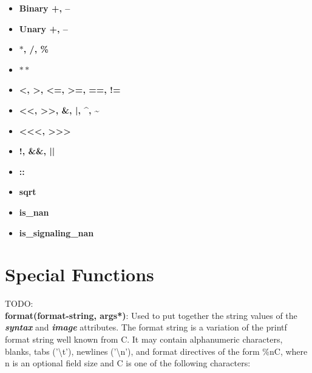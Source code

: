 \documentclass[oneside,final,14pt]{extreport}
\begin{document}
\begin{itemize}

\item \textbf{Binary +, --}

\item \textbf{Unary +, --}

\item \textbf{$\ast$, /, \%}

\item \textbf{$\ast\ast$}

\item \textbf{<, >, <=, >=, ==, !=}

\item \textbf{{<}{<}, {>}{>}, \&, |, \^{}, \~{}}

\item \textbf{{<}{<}{<}, {>}{>}{>}}

\item \textbf{!, \&\&, ||}

\item \textbf{::}

\item \textbf{sqrt}

\item \textbf{is{\_}nan}

\item \textbf{is{\_}signaling{\_}nan}

\end{itemize}


\section{Special Functions}

TODO:\\

\textbf{format(format-string, args*)}:
Used to put together the string values of the \textbf{\textit{syntax}} and \textbf{\textit{image}}
attributes. The format string is a variation of the printf format string well known from C.
It may contain alphanumeric characters, blanks, tabs ('\textbackslash t'), newlines
('\textbackslash n'), and format directives of the form \%nC, where n is an optional field size
and C is one of the following characters:
\end{document}
